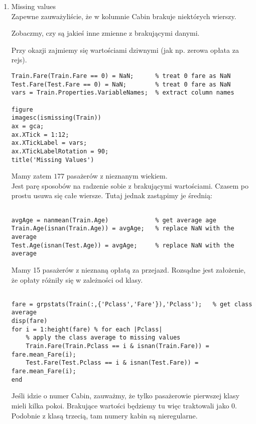 \documentclass[12pt]{amsbook}
\theoremstyle{definition}
\begin{document}
\begin{enumerate}
\item Missing values\\

Zapewne zauważyliście, że w kolumnie Cabin brakuje niektórych wierszy.

Zobaczmy, czy są jakieś inne zmienne z brakującymi danymi.

Przy okazji zajmiemy się wartościami dziwnymi (jak np. zerowa opłata za rejs).

\begin{lstlisting}
Train.Fare(Train.Fare == 0) = NaN;      % treat 0 fare as NaN
Test.Fare(Test.Fare == 0) = NaN;        % treat 0 fare as NaN
vars = Train.Properties.VariableNames;  % extract column names

figure
imagesc(ismissing(Train))
ax = gca;
ax.XTick = 1:12;
ax.XTickLabel = vars;
ax.XTickLabelRotation = 90;
title('Missing Values')
\end{lstlisting}


Mamy zatem $177$ pasażerów z nieznanym wiekiem.\\
Jest parę sposobów na radzenie sobie z brakującymi wartościami. Czasem po prostu usuwa się całe wiersze.
Tutaj jednak zastąpimy je średnią:

\begin{lstlisting}

avgAge = nanmean(Train.Age)             % get average age
Train.Age(isnan(Train.Age)) = avgAge;   % replace NaN with the average
Test.Age(isnan(Test.Age)) = avgAge;     % replace NaN with the average

\end{lstlisting}

Mamy 15 pasażerów z nieznaną opłatą za przejazd.
Rozsądne jest założenie, że opłaty różniły się w zależności od klasy.


\begin{lstlisting}

fare = grpstats(Train(:,{'Pclass','Fare'}),'Pclass');   % get class average
disp(fare)
for i = 1:height(fare) % for each |Pclass|
    % apply the class average to missing values
    Train.Fare(Train.Pclass == i & isnan(Train.Fare)) = fare.mean_Fare(i);
    Test.Fare(Test.Pclass == i & isnan(Test.Fare)) = fare.mean_Fare(i);
end
\end{lstlisting}

Jeśli idzie o numer Cabin, zauważmy, że tylko pasażerowie pierwszej klasy mieli kilka pokoi.
Brakujące wartości będziemy tu więc traktowali jako $0$. Podobnie z klasą trzecią, tam numery kabin są nieregularne.


\end{enumerate}
\end{document}
